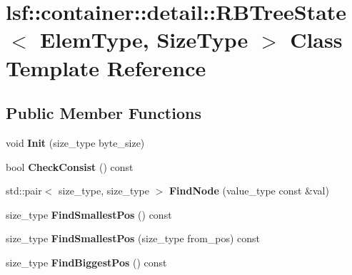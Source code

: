 \hypertarget{classlsf_1_1container_1_1detail_1_1RBTreeState}{
\section{lsf::container::detail::RBTreeState$<$ ElemType, SizeType $>$ Class Template Reference}
\label{classlsf_1_1container_1_1detail_1_1RBTreeState}
}
\subsection*{Public Member Functions}
\begin{DoxyCompactItemize}
\item 
\hypertarget{classlsf_1_1container_1_1detail_1_1RBTreeState_af83f48f391e5d24f883adc81df5f273c}{
void {\bfseries Init} (size\_\-type byte\_\-size)}
\label{classlsf_1_1container_1_1detail_1_1RBTreeState_af83f48f391e5d24f883adc81df5f273c}

\item 
\hypertarget{classlsf_1_1container_1_1detail_1_1RBTreeState_a4e318df00ff51892982671ecdd429e2b}{
bool {\bfseries CheckConsist} () const }
\label{classlsf_1_1container_1_1detail_1_1RBTreeState_a4e318df00ff51892982671ecdd429e2b}

\item 
\hypertarget{classlsf_1_1container_1_1detail_1_1RBTreeState_ad3060be1ce6c407d5f2e9a076af1a37d}{
std::pair$<$ size\_\-type, size\_\-type $>$ {\bfseries FindNode} (value\_\-type const \&val)}
\label{classlsf_1_1container_1_1detail_1_1RBTreeState_ad3060be1ce6c407d5f2e9a076af1a37d}

\item 
\hypertarget{classlsf_1_1container_1_1detail_1_1RBTreeState_a985ec78507bef1775d69b191d2006730}{
size\_\-type {\bfseries FindSmallestPos} () const }
\label{classlsf_1_1container_1_1detail_1_1RBTreeState_a985ec78507bef1775d69b191d2006730}

\item 
\hypertarget{classlsf_1_1container_1_1detail_1_1RBTreeState_ae6d4d4b9b55abd6e3af87b8593a612e3}{
size\_\-type {\bfseries FindSmallestPos} (size\_\-type from\_\-pos) const }
\label{classlsf_1_1container_1_1detail_1_1RBTreeState_ae6d4d4b9b55abd6e3af87b8593a612e3}

\item 
\hypertarget{classlsf_1_1container_1_1detail_1_1RBTreeState_a7b8f0354788f1459b0e7c989fd22d5f7}{
size\_\-type {\bfseries FindBiggestPos} () const }
\label{classlsf_1_1container_1_1detail_1_1RBTreeState_a7b8f0354788f1459b0e7c989fd22d5f7}


\end{DoxyCompactItemize}
